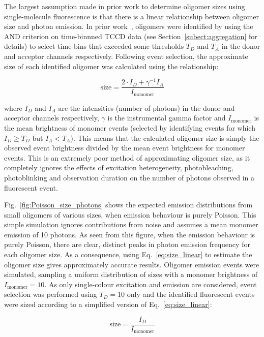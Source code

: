The largest assumption made in prior work to determine oligomer sizes using single-molecule fluorescence is that there is a linear relationship between oligomer size and photon emission. In prior work~\cite{cremades2012}, oligomers were identified by using the AND criterion on time-binnned TCCD data (see Section~\ref{subect:aggregation} for details) to select time-bins that exceeded some thresholds $T_D$ and $T_A$ in the donor and acceptor channels respectively. Following event selection, the approximate size of each identified oligomer was calculated using the relationship:

\begin{equation}
\text{size} = \frac{2\cdot I_D + \gamma^{-1} I_A}{I_{\text{monomer}}}
\label{eq:size_linear}
\end{equation}

where $I_D$ and $I_A$ are the intensities (number of photons) in the donor and acceptor channels respectively, $\gamma$ is the instrumental gamma factor and $I_{\text{monomer}}$ is the mean brightness of monomer events (selected by identifying events for which $I_D \geq T_D$ but $I_A < T_A$). This means that the calculated oligomer size is simply the observed event brightness divided by the mean event brightness for monomer events. This is an extremely poor method of approximating oligomer size, as it completely ignores the effects of excitation heterogeneity, photobleaching, photoblinking and observation duration on the number of photons observed in a fluorescent event.

Fig.~\ref{fig:Poisson_size_photons} shows the expected emission distributions from small oligomers of various sizes, when emission behaviour is purely Poisson. This simple simulation ignores contributions from noise and assumes a mean monomer emission of 10 photons. As seen from this figure, when the emission behaviour is purely Poisson, there are clear, distinct peaks in photon emission frequency for each oligomer size. As a consequence, using Eq.~\ref{eq:size_linear} to estimate the oligomer size gives approximately accurate results. Oligomer emission events were simulated, sampling a uniform distribution of sizes with a monomer brightness of $I_{\text{monomer}} = 10$. As only single-colour excitation and emission are considered, event selection was performed using $T_D = 10$ only and the identified fluorescent events were sized according to a simplified version of Eq.~\ref{eq:size_linear}:

\begin{equation}
\text{size} = \frac{I_D}{I_{\text{monomer}}}
\label{eq:size_linear_simple}
\end{equation}

